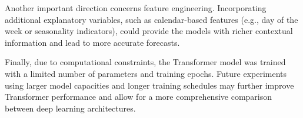 \par
Another important direction concerns feature engineering. Incorporating additional explanatory variables, such as calendar-based features (e.g., day of the week or seasonality indicators), could provide the models with richer contextual information and lead to more accurate forecasts.

\par
Finally, due to computational constraints, the Transformer model was trained with a limited number of parameters and training epochs. Future experiments using larger model capacities and longer training schedules may further improve Transformer performance and allow for a more comprehensive comparison between deep learning architectures.
